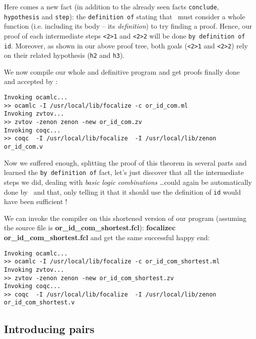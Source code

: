 \documentclass[11pt,a4paper,twoside,onecolumn,fullpage]{article}
\begin{document}
Here comes
a new fact (in addition to the already seen facts \lstinline"conclude",
\lstinline"hypothesis" and \lstinline"step"): the
\lstinline"definition of" stating that \zenon\ must consider a whole
function (i.e. including its body -- its {\em definition}) to try
finding a proof. Hence, our proof of each intermediate steps
\lstinline"<2>1" and \lstinline"<2>2" will be done
\lstinline"by definition of id". Moreover, as shown in our above proof
tree, both goals (\lstinline"<2>1" and \lstinline"<2>2") rely on their
related hypothesis (\lstinline"h2" and \lstinline"h3").

{\scriptsize
}

We now compile our whole and definitive program and get proofs finally
done and accepted by \coq:

{\scriptsize
\begin{verbatim}
Invoking ocamlc...
>> ocamlc -I /usr/local/lib/focalize -c or_id_com.ml
Invoking zvtov...
>> zvtov -zenon zenon -new or_id_com.zv
Invoking coqc...
>> coqc  -I /usr/local/lib/focalize  -I /usr/local/lib/zenon or_id_com.v
\end{verbatim}}

Now we suffered enough, splitting the proof of this theorem in several
parts and learned the \lstinline{by definition of} fact, let's just
discover that all the intermediate steps we did, dealing with {\em basic
logic combinations} \ldots could again be automatically done by
\zenon\ and that, only telling it that it should use the definition of
\lstinline{id} would have been sufficient !

{\scriptsize
}

We can invoke the compiler on this shortened version of our program
(assuming the source file is \textbf{or\_id\_com\_shortest.fcl}):
\textbf{focalizec or\_id\_com\_shortest.fcl} and get the same successful
happy end:

{\scriptsize
\begin{verbatim}
Invoking ocamlc...
>> ocamlc -I /usr/local/lib/focalize -c or_id_com_shortest.ml
Invoking zvtov...
>> zvtov -zenon zenon -new or_id_com_shortest.zv
Invoking coqc...
>> coqc  -I /usr/local/lib/focalize  -I /usr/local/lib/zenon or_id_com_shortest.v
\end{verbatim}}


\subsection{Introducing pairs}
\end{document}
